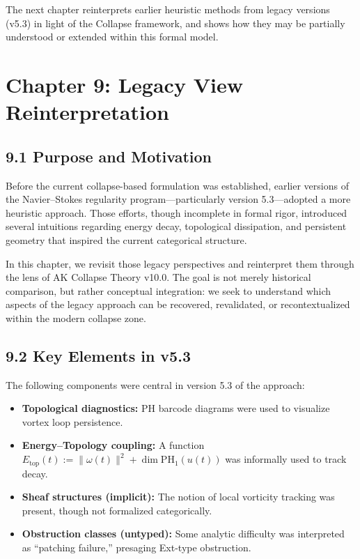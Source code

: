 \documentclass[11pt]{article}
\begin{document}
The next chapter reinterprets earlier heuristic methods from legacy versions (v5.3) in light of the Collapse framework,  
and shows how they may be partially understood or extended within this formal model.



\section{Chapter 9: Legacy View Reinterpretation}

\subsection{9.1 Purpose and Motivation}

Before the current collapse-based formulation was established,  
earlier versions of the Navier–Stokes regularity program—particularly version 5.3—adopted a more heuristic approach.  
Those efforts, though incomplete in formal rigor, introduced several intuitions regarding energy decay, topological dissipation,  
and persistent geometry that inspired the current categorical structure.

In this chapter, we revisit those legacy perspectives and reinterpret them through the lens of AK Collapse Theory v10.0.  
The goal is not merely historical comparison, but rather conceptual integration:  
we seek to understand which aspects of the legacy approach can be recovered, revalidated, or recontextualized within the modern collapse zone.

\subsection{9.2 Key Elements in v5.3}

The following components were central in version 5.3 of the approach:

\begin{itemize}
  \item \textbf{Topological diagnostics:} PH barcode diagrams were used to visualize vortex loop persistence.
  \item \textbf{Energy–Topology coupling:} A function \( E_{\mathrm{top}}(t) := \|\omega(t)\|^2 + \dim \mathrm{PH}_1(u(t)) \) was informally used to track decay.
  \item \textbf{Sheaf structures (implicit):} The notion of local vorticity tracking was present, though not formalized categorically.
  \item \textbf{Obstruction classes (untyped):} Some analytic difficulty was interpreted as “patching failure,” presaging Ext-type obstruction.
\end{itemize}
\end{document}
